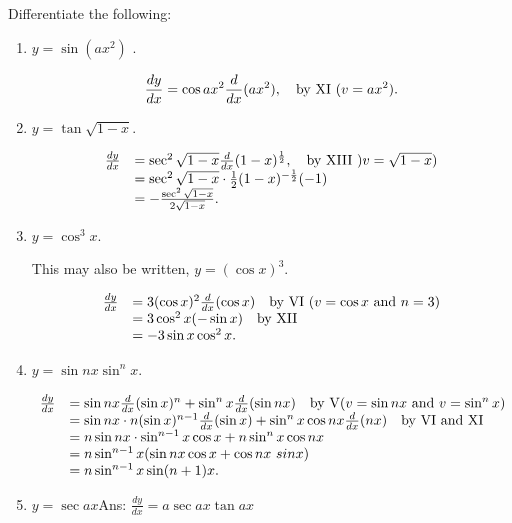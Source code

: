 Differentiate the following:

\begin{enumerate}
\item
$y = \sin (ax^2)$ .

\[
\frac{dy}{dx} 	= \cos ax^2 \frac{d}{dx}(ax^2),\ \ \ {\rm  by\ XI\ } (v = ax^2).
\]

\item
$y = \tan \sqrt{1 - x}$.

\[
\begin{array}{ll}
\frac{dy}{dx} &	= \sec^2 \sqrt{1 - x} \frac{d}{dx}(1 - x)^{\frac{1}{2}},
\ \ \ {\rm by\ XIII\ })v = \sqrt{1 - x})\\
&  	= \sec^2 \sqrt{1 - x} \cdot \frac{1}{2} (1 - x)^{-\frac{1}{2}}(-1)\\
&  	= -\frac{\sec^2 \sqrt{1 - x}}{2\sqrt{1 - x}}.
\end{array}
\]

\item
$y = \cos^3x$.

This may also be written,
$y 	= (\cos x)^3$.

\[
\begin{array}{ll}
\frac{dy}{dx} 
&	= 3(\cos x)^2 \frac{d}{dx}(\cos x) \ \ \ {\rm 	by\ VI}\ (v = \cos x\ {\rm and}\ n = 3)\\
&  	= 3\cos^2x( - \sin x)  \ \ \ {\rm by\ XII}\\
&  	= - 3\sin x\cos^2x.
\end{array}
\]

\item
$y = \sin nx\sin^nx$.

\[
\begin{array}{ll}
\frac{dy}{dx} &	
= \sin nx \frac{d}{dx}(\sin x)^n + \sin^n x \frac{d}{dx}(\sin nx)  
\ \ \ {\rm by\ V} (v = \sin nx\ {\rm and}\  v = \sin^nx)\\
&  	= \sin nx \cdot n(\sin x)^{n - 1} \frac{d}{dx}(\sin x) + \sin^n x \cos nx \frac{d}{dx}(nx) 
\ \ \ {\rm by\ 	VI\ and\  XI}\\
&  	= n \sin nx \cdot \sin^{n - 1} x \cos x + n \sin^n x \cos nx\\
&  	= n\sin^{n - 1}x(\sin nx \cos x + \cos nx\ sinx)\\
&  	= n\sin^{n - 1}x \sin(n + 1)x.
\end{array}
\]

\item
$y = \sec ax$\qquad\qquad\qquad\qquad\qquad\qquad Ans:  	$\frac{dy}{dx} =	a\sec ax\tan ax$


\end{enumerate}
